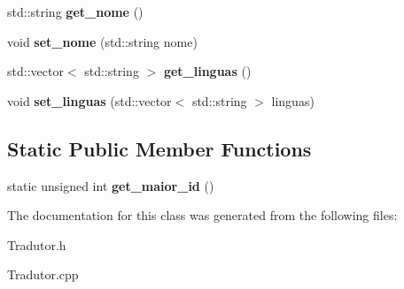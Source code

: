 \begin{DoxyCompactItemize}
\item 
\hypertarget{class_tradutor_a3547a7d337cd421be409e5bf63418964}{std\-::string {\bfseries get\-\_\-nome} ()}\label{class_tradutor_a3547a7d337cd421be409e5bf63418964}

\item 
\hypertarget{class_tradutor_aa50fdceab0ca03dfe5c2a1639bc5869e}{void {\bfseries set\-\_\-nome} (std\-::string nome)}\label{class_tradutor_aa50fdceab0ca03dfe5c2a1639bc5869e}

\item 
\hypertarget{class_tradutor_a011b86fa2dae11c6ccdda1cbeb844e94}{std\-::vector$<$ std\-::string $>$ {\bfseries get\-\_\-linguas} ()}\label{class_tradutor_a011b86fa2dae11c6ccdda1cbeb844e94}

\item 
\hypertarget{class_tradutor_a83ed5b48e00f3a15c579e209bb01d53f}{void {\bfseries set\-\_\-linguas} (std\-::vector$<$ std\-::string $>$ linguas)}\label{class_tradutor_a83ed5b48e00f3a15c579e209bb01d53f}

\end{DoxyCompactItemize}
\subsection*{Static Public Member Functions}
\begin{DoxyCompactItemize}
\item 
\hypertarget{class_tradutor_af2caad7e33c443f238851c5bb2d63930}{static unsigned int {\bfseries get\-\_\-maior\-\_\-id} ()}\label{class_tradutor_af2caad7e33c443f238851c5bb2d63930}

\end{DoxyCompactItemize}


The documentation for this class was generated from the following files\-:\begin{DoxyCompactItemize}
\item 
Tradutor.\-h\item 
Tradutor.\-cpp\end{DoxyCompactItemize}
